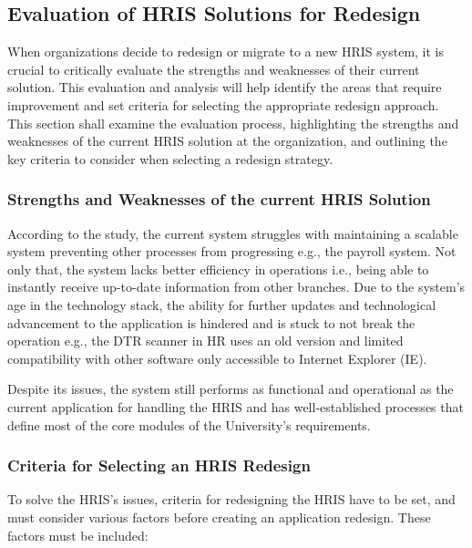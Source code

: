    
    
    \subsection{Evaluation of HRIS Solutions for Redesign}
    
    When organizations decide to redesign or migrate to a new HRIS system, it is crucial to critically evaluate the strengths and weaknesses of their current solution. This evaluation and analysis will help identify the areas that require improvement and set criteria for selecting the appropriate redesign approach. This section shall examine the evaluation process, highlighting the strengths and weaknesses of the current HRIS solution at the organization, and outlining the key criteria to consider when selecting a redesign strategy.
    
        \subsubsection{Strengths and Weaknesses of the current HRIS Solution}
        According to the study, the current system struggles with maintaining a scalable system preventing other processes from progressing e.g., the payroll system. Not only that, the system lacks better efficiency in operations i.e., being able to instantly receive up-to-date information from other branches. Due to the system's age in the technology stack, the ability for further updates and technological advancement to the application is hindered and is stuck to not break the operation e.g., the DTR scanner in HR uses an old version and limited compatibility with other software only accessible to Internet Explorer (IE). 

        Despite its issues, the system still performs as functional and operational as the current application for handling the HRIS and has well-established processes that define most of the core modules of the University's requirements. 
        
        \subsubsection{Criteria for Selecting an HRIS Redesign}
        To solve the HRIS's issues, criteria for redesigning the HRIS have to be set, and must consider various factors before creating an application redesign. These factors must be included:

